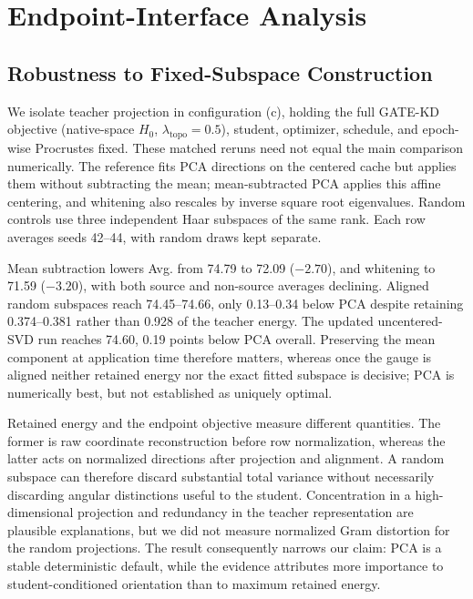 \FloatBarrier

\section{Endpoint-Interface Analysis}
\label{app:endpoint-analysis}

\subsection{Robustness to Fixed-Subspace Construction}
\label{app:pca-controls}

We isolate teacher projection in configuration (c), holding the full GATE-KD
objective (native-space $H_0$, $\lambda_{\mathrm{topo}}=0.5$), student,
optimizer, schedule, and epoch-wise Procrustes fixed. These matched reruns need
not equal the main comparison numerically. The reference fits PCA directions on
the centered cache but applies them without subtracting the mean;
mean-subtracted PCA applies this affine centering, and whitening also rescales
by inverse square root eigenvalues. Random controls use three independent Haar
subspaces of the same rank. Each row averages seeds 42--44, with random draws
kept separate.



Mean subtraction lowers Avg. from 74.79 to 72.09 ($-2.70$), and whitening to
71.59 ($-3.20$), with both source and non-source averages declining. Aligned random subspaces reach
74.45--74.66, only 0.13--0.34 below PCA despite retaining 0.374--0.381 rather
than 0.928 of the teacher energy. The updated uncentered-SVD run reaches 74.60,
0.19 points below PCA overall. Preserving the mean component at application
time therefore matters, whereas once the gauge is aligned neither retained
energy nor the exact fitted subspace is decisive; PCA is numerically best, but
not established as uniquely optimal.

Retained energy and the endpoint objective measure different quantities. The
former is raw coordinate reconstruction before row normalization, whereas the
latter acts on normalized directions after projection and alignment. A random
subspace can therefore discard substantial total variance without necessarily
discarding angular distinctions useful to the student. Concentration in a
high-dimensional projection and redundancy in the teacher representation are
plausible explanations, but we did not measure normalized Gram distortion for
the random projections. The result consequently narrows our claim: PCA is a
stable deterministic default, while the evidence attributes more importance to
student-conditioned orientation than to maximum retained energy.

